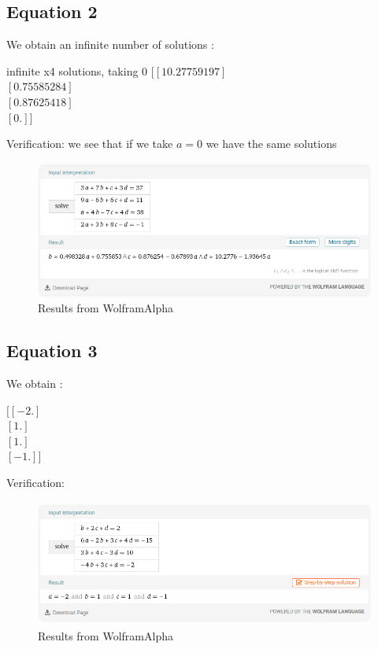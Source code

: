 \subsection{Equation 2}

We obtain an infinite number of solutions : \\
\begin{resultbox}
  infinite x4 solutions, taking 0
  $[[10.27759197]$ \\
  $ [ 0.75585284]$ \\
  $ [ 0.87625418]$ \\
  $ [ 0.        ]]$
\end{resultbox}
Verification: we see that if we take $a=0$ we have the same solutions
\begin{figure}[H]
  \centering
  \includegraphics[width=14cm]{images/lineq2.png}
  \caption{Results from WolframAlpha}
  \label{fig:lineq2}
\end{figure}

\subsection{Equation 3}

We obtain : \\
\begin{resultbox}
$[[-2.]$\\
$ [ 1.]$\\
$ [ 1.]$\\
$ [-1.]]$
\end{resultbox}
Verification:
\begin{figure}[H]
  \centering
  \includegraphics[width=14cm]{images/lineq3.png}
  \caption{Results from WolframAlpha}
  \label{fig:lineq3}
\end{figure}

